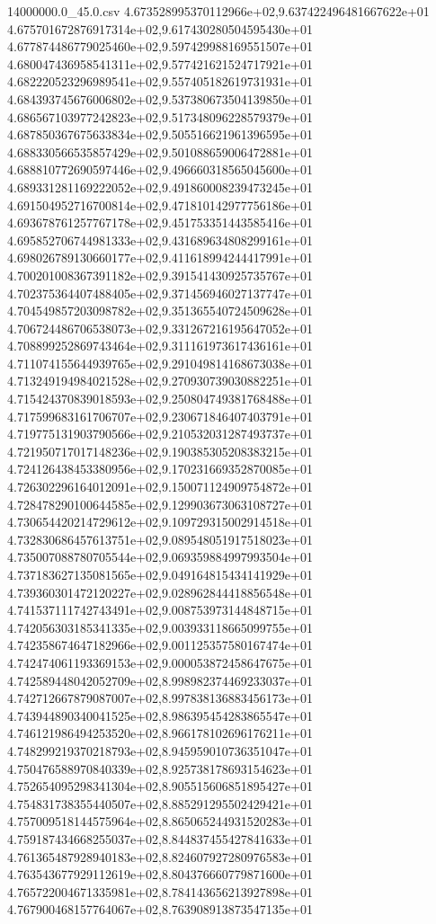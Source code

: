 \begin{filecontents*}{14000000.0_45.0.csv}
4.673528995370112966e+02,9.637422496481667622e+01
4.675701672876917314e+02,9.617430280504595430e+01
4.677874486779025460e+02,9.597429988169551507e+01
4.680047436958541311e+02,9.577421621524717921e+01
4.682220523296989541e+02,9.557405182619731931e+01
4.684393745676006802e+02,9.537380673504139850e+01
4.686567103977242823e+02,9.517348096228579379e+01
4.687850367675633834e+02,9.505516621961396595e+01
4.688330566535857429e+02,9.501088659006472881e+01
4.688810772690597446e+02,9.496660318565045600e+01
4.689331281169222052e+02,9.491860008239473245e+01
4.691504952716700814e+02,9.471810142977756186e+01
4.693678761257767178e+02,9.451753351443585416e+01
4.695852706744981333e+02,9.431689634808299161e+01
4.698026789130660177e+02,9.411618994244417991e+01
4.700201008367391182e+02,9.391541430925735767e+01
4.702375364407488405e+02,9.371456946027137747e+01
4.704549857203098782e+02,9.351365540724509628e+01
4.706724486706538073e+02,9.331267216195647052e+01
4.708899252869743464e+02,9.311161973617436161e+01
4.711074155644939765e+02,9.291049814168673038e+01
4.713249194984021528e+02,9.270930739030882251e+01
4.715424370839018593e+02,9.250804749381768488e+01
4.717599683161706707e+02,9.230671846407403791e+01
4.719775131903790566e+02,9.210532031287493737e+01
4.721950717017148236e+02,9.190385305208383215e+01
4.724126438453380956e+02,9.170231669352870085e+01
4.726302296164012091e+02,9.150071124909754872e+01
4.728478290100644585e+02,9.129903673063108727e+01
4.730654420214729612e+02,9.109729315002914518e+01
4.732830686457613751e+02,9.089548051917518023e+01
4.735007088780705544e+02,9.069359884997993504e+01
4.737183627135081565e+02,9.049164815434141929e+01
4.739360301472120227e+02,9.028962844418856548e+01
4.741537111742743491e+02,9.008753973144848715e+01
4.742056303185341335e+02,9.003933118665099755e+01
4.742358674647182966e+02,9.001125357580167474e+01
4.742474061193369153e+02,9.000053872458647675e+01
4.742589448042052709e+02,8.998982374469233037e+01
4.742712667879087007e+02,8.997838136883456173e+01
4.743944890340041525e+02,8.986395454283865547e+01
4.746121986494253520e+02,8.966178102696176211e+01
4.748299219370218793e+02,8.945959010736351047e+01
4.750476588970840339e+02,8.925738178693154623e+01
4.752654095298341304e+02,8.905515606851895427e+01
4.754831738355440507e+02,8.885291295502429421e+01
4.757009518144575964e+02,8.865065244931520283e+01
4.759187434668255037e+02,8.844837455427841633e+01
4.761365487928940183e+02,8.824607927280976583e+01
4.763543677929112619e+02,8.804376660779871600e+01
4.765722004671335981e+02,8.784143656213927898e+01
4.767900468157764067e+02,8.763908913873547135e+01

\end{filecontents*}
